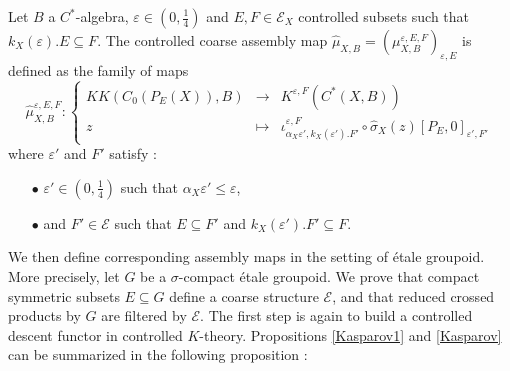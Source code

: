 \begin{definition}
Let $B$ a $C^*$-algebra, $\varepsilon\in (0,\frac{1}{4})$ and $E,F\in\mathcal E_X$ controlled subsets such that $k_X(\varepsilon).E\subseteq F$. The controlled coarse assembly map $\hat\mu_{X,B}=(\mu_{X,B}^{\varepsilon,E,F})_{\varepsilon,E}$ is defined as the family of maps
\[\hat\mu_{X,B}^{\varepsilon, E,F} :\left\{\begin{array}{rcl} KK(C_0(P_E(X)),B) & \rightarrow & K^{\varepsilon, F}(C^*(X,B)) \\
					z & \mapsto & \iota_{\alpha_X \varepsilon',k_X(\varepsilon').F'}^{\varepsilon,F}\circ\hat\sigma_X(z)[P_{E},0]_{\varepsilon', F'}\end{array}\right.\]
where $\varepsilon'$ and $F'$ satisfy :
\begin{itemize}
\item[$\bullet$] $\varepsilon'\in (0,\frac{1}{4})$ such that $\alpha_X \varepsilon'\leq \varepsilon$,
\item[$\bullet$] and $F'\in\mathcal E$ such that $E\subseteq F'$ and $k_X(\varepsilon').F'\subseteq F$.
\end{itemize}
\end{definition}

We then define corresponding assembly maps in the setting of étale groupoid. More precisely, let $G$ be a $\sigma$-compact étale groupoid. We prove that compact symmetric subsets $E\subseteq G$ define a coarse structure $\mathcal E$, and that reduced crossed products by $G$ are filtered by $\mathcal E$. The first step is again to build a controlled descent functor in controlled $K$-theory. Propositions \ref{Kasparov1} and \ref{Kasparov} can be summarized in the following proposition : 

